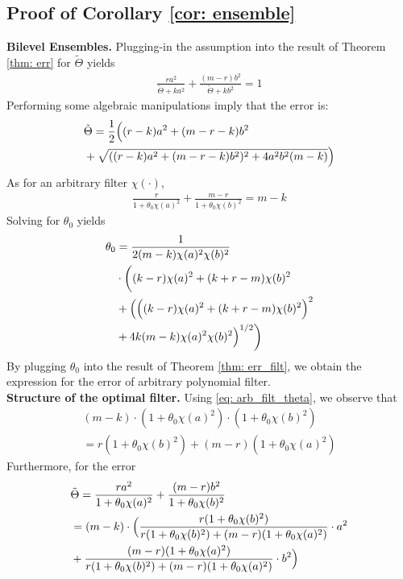\documentclass[conference]{IEEEtran}
\begin{document}
\subsection{Proof of Corollary \ref{cor: ensemble}}
\textbf{Bilevel Ensembles.} Plugging-in the assumption into the result of Theorem \ref{thm: err} for $\tilde{\Theta}$ yields
\begin{align*}
    \frac{ra^2}{\tilde{\Theta}+ k a^2} + \frac{(m-r) b^2}{\tilde{\Theta} + k b^2} = 1
\end{align*}
Performing some algebraic manipulations imply that the error is:
\begin{align*}
     & \tilde{\Theta} =
    \frac{1}{2} \Bigl((r-k) a^2 + (m - r- k) b^2 \\& + \sqrt{((r-k) a^2 + (m - r- k) b^2)^2 + 4 a^2 b ^2 (m-k)} \Bigr)
\end{align*}
As for an arbitrary filter $\chi(\cdot)$,
\begin{align} \label{eq: arb_filt_theta}
    \frac{r}{1 + \theta_0 \chi(a)^2} + \frac{m-r}{1 + \theta_0 \chi(b)^2} = m - k
\end{align}
Solving for $\theta_0$ yields
\begin{align*}
    \theta_0 &= \frac{1}{2(m-k) \chi(a)^2 \chi(b)^2 } \\ &\cdot \biggl( (k-r) \chi(a)^2 + (k + r - m) \chi(b)^2 \\ &+ \Bigl(\Bigl((k-r) \chi(a)^2 + (k + r - m) \chi(b)^2 \Bigr)^2 \\ &+ 4 k (m-k) \chi(a)^2 \chi(b)^2\Bigr)^{1/2}
    \biggr) 
\end{align*}
By plugging $\theta_0$ into the result of Theorem \ref{thm: err_filt}, we obtain the expression for the error of arbitrary polynomial filter. \\
\textbf{Structure of the optimal filter.} Using \eqref{eq: arb_filt_theta}, we observe that
\begin{align*}
    (m-k)\cdot (1 + \theta_0 \chi(a)^2)\cdot (1 + \theta_0 \chi(b)^2) \\ = r (1 + \theta_0 \chi(b)^2) + (m-r) (1 + \theta_0 \chi(a)^2)
\end{align*}
Furthermore, for the error
\begin{align*}
    &\tilde{\Theta} = \frac{r a^2}{1 + \theta_0 \chi(a)^2} + \frac{(m-r) b^2}{1 + \theta_0 \chi(b)^2} \\
    &= (m-k) \cdot \Bigl(\frac{r (1 + \theta_0 \chi(b)^2)}{r (1 + \theta_0 \chi(b)^2) + (m-r) (1 + \theta_0 \chi(a)^2)}\cdot a^2 \\ &+ \frac{(m-r) (1 + \theta_0 \chi(a)^2)}{r (1 + \theta_0 \chi(b)^2) + (m-r) (1 + \theta_0 \chi(a)^2)} \cdot b^2\Bigr)
\end{align*}
\end{document}
